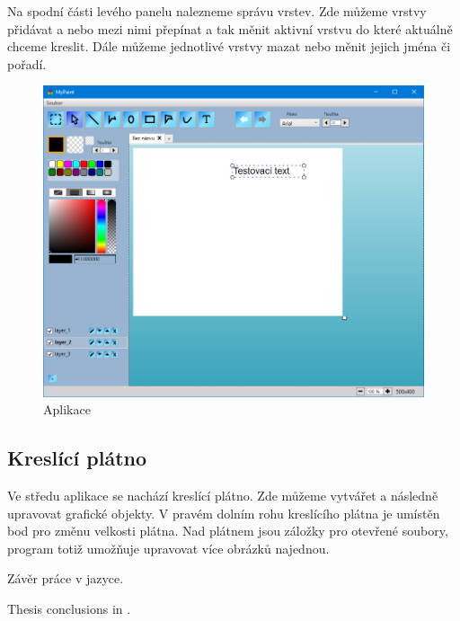\documentclass[
  field=inf,
  biblatex,
  glossaries,
  index
]{kidiplom}
\begin{document}
Na spodní části levého panelu nalezneme správu vrstev. Zde můžeme vrstvy přidávat a nebo mezi nimi přepínat a tak měnit aktivní vrstvu do které aktuálně chceme kreslit. Dále můžeme jednotlivé vrstvy mazat nebo měnit jejich jména či pořadí.

\begin{figure}
\includegraphics[width=15cm]{img/program}
\caption{Aplikace}
\end{figure}  

\subsection{Kreslící plátno}

Ve středu aplikace se nachází kreslící plátno. Zde můžeme vytvářet a následně upravovat grafické objekty. V pravém dolním rohu kreslícího plátna je umístěn bod pro změnu velkosti plátna. Nad plátnem jsou záložky pro otevřené soubory, program totiž umožňuje upravovat více obrázků najednou.




\begin{kiconclusions}
Závěr práce v  jazyce.
\end{kiconclusions}

\begin{kiconclusions}[english]
Thesis conclusions in .
\end{kiconclusions}
\end{document}
